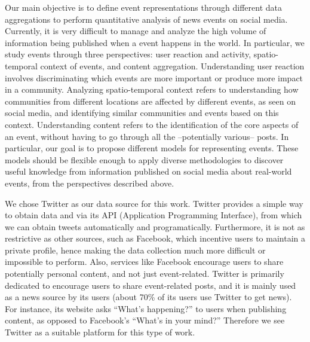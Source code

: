 \documentclass[runningheads]{llncs}
\begin{document}

Our main objective is to define event representations through different data
aggregations to perform quantitative analysis of news events on social media.
%
Currently, it is very difficult to manage and analyze the high volume of
information being published when a event happens in the world. 
%
In particular, we study events through three perspectives: user reaction and
activity, spatio-temporal context of events, and content aggregation.
%
Understanding user reaction involves discriminating which events are more
important or produce more impact in a community. 
%
Analyzing spatio-temporal context refers to understanding how communities from
different locations are affected by different events, as seen on social media,
and identifying similar communities and events based on this context. 
%
Understanding content refers to the identification of the core aspects of an
event, without having to go through all the --potentially various-- posts.
%
In particular, our goal is to propose different models for representing events. 
%
These models should be flexible enough to apply diverse methodologies to
discover useful knowledge from information published on social media about
real-world events, from the perspectives described above. 




We chose Twitter as our data source for this work. 
%
Twitter provides a simple way to obtain data and via its API (Application
Programming Interface), from which we can obtain tweets automatically and
programatically.
%
Furthermore, it is not as restrictive as other sources, such as Facebook, which
incentive users to maintain a private profile, hence making the data collection
much more difficult or impossible to perform.
%
Also, services like Facebook encourage users to share potentially personal
content, and not just event-related.
%
Twitter is primarily dedicated to encourage users to share event-related posts,
and it is mainly used as a news source by its users (about 70\% of its users use
Twitter to get news). 
%
For instance, its website asks “What’s happening?” to users when publishing
content, as opposed to Facebook’s “What’s in your mind?”
%
Therefore we see Twitter as a suitable platform for this type of work.

\end{document}
